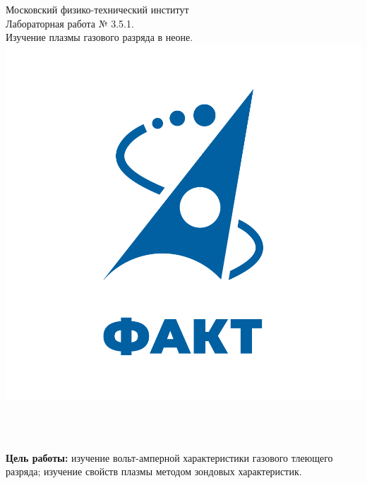 \documentclass[a4paper,12pt]{article} %
\begin{document}

\begin{titlepage}
\begin{center}
	\large{Московский физико-технический институт}\\
	\vspace{100px}
	\LARGE{Лабораторная работа № 3.5.1.}\\
	\LARGE{Изучение плазмы газового разряда в неоне.}\\
	\vspace{30px}
	\includegraphics[scale = 0.3]{fakt_logo.png}\\
\end{center}

\vfill
\begin{flushright}
	\\
	\\
\end{flushright}
\end{titlepage}

\newpage

\tableofcontents

\newpage

\textbf{Цель работы:} изучение вольт-амперной характеристики газового тлеющего разряда; изучение свойств плазмы методом зондовых характеристик.
\end{document}
